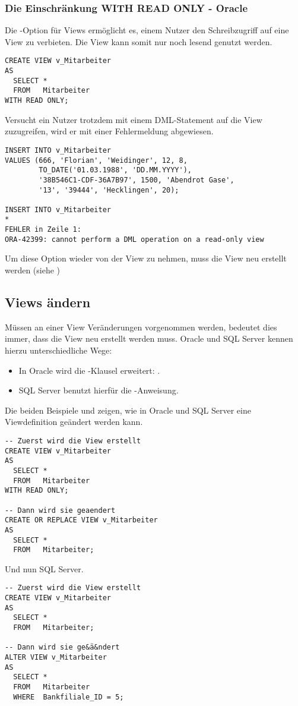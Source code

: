 \subsubsection{Die Einschränkung WITH READ ONLY - Oracle}
\label{READONLY}
Die -Option für Views ermöglicht es, einem Nutzer den Schreibzugriff auf eine View zu verbieten. Die View kann somit nur noch lesend genutzt werden.
\begin{lstlisting}[language=oracle_sql,caption={Eine View mit mit READ ONLY Option erstellen},label=sql08_38]
CREATE VIEW v_Mitarbeiter
AS
  SELECT *
  FROM   Mitarbeiter
WITH READ ONLY;
          \end{lstlisting}
Versucht ein Nutzer trotzdem mit einem DML-Statement auf die View zuzugreifen, wird er mit einer Fehlermeldung abgewiesen.
\clearpage
\begin{lstlisting}[language=oracle_sql,caption={Daten in eine READ ONLY View einfügen schlägt fehl},label=sql08_39]
INSERT INTO v_Mitarbeiter
VALUES (666, 'Florian', 'Weidinger', 12, 8,
        TO_DATE('01.03.1988', 'DD.MM.YYYY'),
        '38B546C1-CDF-36A7B97', 1500, 'Abendrot Gase',
        '13', '39444', 'Hecklingen', 20);

INSERT INTO v_Mitarbeiter
*
FEHLER in Zeile 1:
ORA-42399: cannot perform a DML operation on a read-only view
          \end{lstlisting}
Um diese Option wieder von der View zu nehmen, muss die View neu erstellt werden (siehe )
\subsection{Views ändern}
\label{alterview}
Müssen an einer View Veränderungen vorgenommen werden, bedeutet dies immer, dass die View neu erstellt werden muss. Oracle und SQL Server kennen hierzu unterschiedliche Wege:
\begin{itemize}
    \item In Oracle wird die -Klausel erweitert: .
    \item SQL Server benutzt hierfür die -Anweisung.
\end{itemize}
Die beiden Beispiele  und  zeigen, wie in Oracle und SQL Server eine Viewdefinition geändert werden kann.
\begin{lstlisting}[language=oracle_sql,caption={Eine View ändern in Oracle},label=sql08_40]
-- Zuerst wird die View erstellt
CREATE VIEW v_Mitarbeiter
AS
  SELECT *
  FROM   Mitarbeiter
WITH READ ONLY;

-- Dann wird sie geaendert
CREATE OR REPLACE VIEW v_Mitarbeiter
AS
  SELECT *
  FROM   Mitarbeiter;
        \end{lstlisting}
\clearpage
Und nun SQL Server.
\begin{lstlisting}[language=ms_sql,caption={Eine View ändern in SQL
Server},label=sql08_41]
-- Zuerst wird die View erstellt
CREATE VIEW v_Mitarbeiter
AS
  SELECT *
  FROM   Mitarbeiter;

-- Dann wird sie ge&ä&ndert
ALTER VIEW v_Mitarbeiter
AS
  SELECT *
  FROM   Mitarbeiter
  WHERE  Bankfiliale_ID = 5;
        \end{lstlisting}
